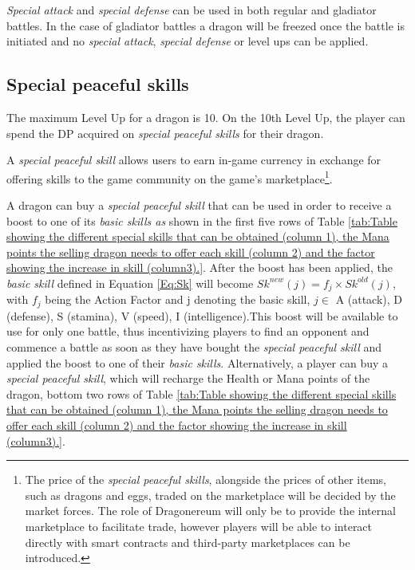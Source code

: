 \documentclass[12pt]{article}
\begin{document}
{\begin{table}[!ht]
 \end{table}


\textit{Special attack} and \textit{special defense} can be used in both regular and gladiator battles. In the case of gladiator battles a dragon will be freezed once the battle is initiated and no \textit{special attack}, \textit{special defense} or level ups can be applied.\par

\subsection{Special peaceful skills}
\label{Special peaceful skills}  \par

The maximum Level Up for a dragon is 10. On the 10th Level Up, the player can spend the DP acquired on \textit{special peaceful skills} for their dragon.\par

A \textit{special peaceful skill} allows users to earn in-game currency in exchange for offering skills to the game community on the game’s marketplace\footnote{The price of the {\it special peaceful skills}, alongside the prices of other items, such as dragons and eggs, traded on the marketplace will be decided by the market forces. The role of Dragonereum will only be to provide the internal marketplace to facilitate trade, however players will be able to interact directly with smart contracts and third-party marketplaces can be introduced.}.\par

A dragon can buy a \textit{special peaceful skill} that can be used in order to receive a boost to one of its \textit{basic skills as }shown in the first five rows of  Table \ref{tab:Table showing the different special skills that can be obtained (column 1), the Mana points the selling dragon needs to offer each skill (column 2) and the factor showing the increase in skill (column3).}. After the boost has been applied, the \textit{basic skill }defined in Equation \ref{Eq:Sk} will become $Sk^{new}(j)=f_j\times Sk^{old}(j)$, with $f_j$ being the Action Factor and j denoting the basic skill, $j \in$  {A (attack), D (defense), S (stamina), V (speed), I (intelligence)}.This boost will be available to use for only one battle, thus incentivizing players to find an opponent and commence a battle as soon as they have bought the \textit{special peaceful skill }and applied the boost to one of their \textit{basic skills}. Alternatively, a player can buy a \textit{special peaceful skill}, which will recharge the Health or Mana points of the dragon, bottom two rows of  Table \ref{tab:Table showing the different special skills that can be obtained (column 1), the Mana points the selling dragon needs to offer each skill (column 2) and the factor showing the increase in skill (column3).}.\par

}
\end{document}
